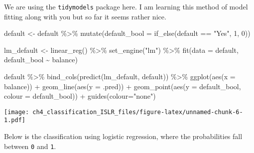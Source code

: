\documentclass[
]{article}
\newenvironment{Shaded}{\begin{snugshade}}{\end{snugshade}}
\newcommand{\AttributeTok}[1]{\textcolor[rgb]{0.77,0.63,0.00}{#1}}
\newcommand{\DecValTok}[1]{\textcolor[rgb]{0.00,0.00,0.81}{#1}}
\newcommand{\FunctionTok}[1]{\textcolor[rgb]{0.00,0.00,0.00}{#1}}
\newcommand{\NormalTok}[1]{#1}
\newcommand{\OtherTok}[1]{\textcolor[rgb]{0.56,0.35,0.01}{#1}}
\newcommand{\SpecialCharTok}[1]{\textcolor[rgb]{0.00,0.00,0.00}{#1}}
\newcommand{\StringTok}[1]{\textcolor[rgb]{0.31,0.60,0.02}{#1}}
\begin{document}
We are using the \texttt{tidymodels} package here. I am learning this
method of model fitting along with you but so far it seems rather nice.

\begin{Shaded}
\begin{Highlighting}[]
\NormalTok{default }\OtherTok{\textless{}{-}}\NormalTok{ default }\SpecialCharTok{\%\textgreater{}\%}
  \FunctionTok{mutate}\NormalTok{(}\AttributeTok{default\_bool =} \FunctionTok{if\_else}\NormalTok{(default }\SpecialCharTok{==} \StringTok{"Yes"}\NormalTok{, }\DecValTok{1}\NormalTok{, }\DecValTok{0}\NormalTok{))}

\NormalTok{lm\_default }\OtherTok{\textless{}{-}} \FunctionTok{linear\_reg}\NormalTok{() }\SpecialCharTok{\%\textgreater{}\%}
  \FunctionTok{set\_engine}\NormalTok{(}\StringTok{"lm"}\NormalTok{) }\SpecialCharTok{\%\textgreater{}\%}
  \FunctionTok{fit}\NormalTok{(}\AttributeTok{data =}\NormalTok{ default, default\_bool }\SpecialCharTok{\textasciitilde{}}\NormalTok{ balance)}

\NormalTok{default }\SpecialCharTok{\%\textgreater{}\%}
  \FunctionTok{bind\_cols}\NormalTok{(}\FunctionTok{predict}\NormalTok{(lm\_default, default)) }\SpecialCharTok{\%\textgreater{}\%}
  \FunctionTok{ggplot}\NormalTok{(}\FunctionTok{aes}\NormalTok{(}\AttributeTok{x =}\NormalTok{ balance)) }\SpecialCharTok{+}
  \FunctionTok{geom\_line}\NormalTok{(}\FunctionTok{aes}\NormalTok{(}\AttributeTok{y =}\NormalTok{  .pred)) }\SpecialCharTok{+}
  \FunctionTok{geom\_point}\NormalTok{(}\FunctionTok{aes}\NormalTok{(}\AttributeTok{y =}\NormalTok{ default\_bool, }\AttributeTok{colour =}\NormalTok{ default\_bool)) }\SpecialCharTok{+}
  \FunctionTok{guides}\NormalTok{(}\AttributeTok{colour=}\StringTok{"none"}\NormalTok{)}
\end{Highlighting}
\end{Shaded}

\texttt{[image: ch4\_classification\_ISLR\_files/figure-latex/unnamed-chunk-6-1.pdf]}

Below is the classification using logistic regression, where the
probabilities fall between \texttt{0} and \texttt{1}.
\end{document}
